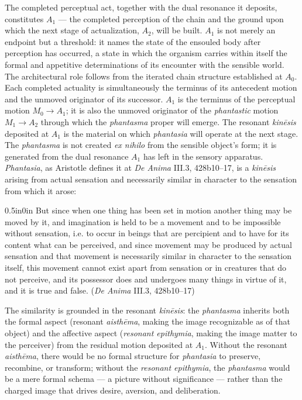 \documentclass{article}
\begin{document}
The completed perceptual act, together with the dual resonance it deposits, constitutes $A_1$ --- the completed perception of the chain and the ground upon which the next stage of actualization, $A_2$, will be built. $A_1$ is not merely an endpoint but a threshold: it names the state of the ensouled body after perception has occurred, a state in which the organism carries within itself the formal and appetitive determinations of its encounter with the sensible world. The architectural role follows from the iterated chain structure established at $A_0$. Each completed actuality is simultaneously the terminus of its antecedent motion and the unmoved originator of its successor. $A_1$ is the terminus of the perceptual motion $M_0 \rightarrow A_1$; it is also the unmoved originator of the \textit{phantastic} motion $M_1 \rightarrow A_2$ through which the \textit{phantasma} proper will emerge. The resonant \textit{kinēsis} deposited at $A_1$ is the material on which \textit{phantasia} will operate at the next stage. The \textit{phantasma} is not created \textit{ex nihilo} from the sensible object's form; it is generated from the dual resonance $A_1$ has left in the sensory apparatus. \textit{Phantasia}, as Aristotle defines it at \textit{De Anima} III.3, 428b10--17, is a \textit{kinēsis} arising from actual sensation and necessarily similar in character to the sensation from which it arose:
\begin{adjustwidth}{0.5in}{0in}
But since when one thing has been set in motion another thing may be moved by it, and imagination is held to be a movement and to be impossible without sensation, i.e. to occur in beings that are percipient and to have for its content what can be perceived, and since movement may be produced by actual sensation and that movement is necessarily similar in character to the sensation itself, this movement cannot exist apart from sensation or in creatures that do not perceive, and its possessor does and undergoes many things in virtue of it, and it is true and false. (\textit{De Anima} III.3, 428b10--17)
\end{adjustwidth}
The similarity is grounded in the resonant \textit{kinēsis}: the \textit{phantasma} inherits both the formal aspect (resonant \textit{aisthēma}, making the image recognizable as of that object) and the affective aspect (\textit{resonant epithymia}, making the image matter to the perceiver) from the residual motion deposited at $A_1$. Without the resonant \textit{aisthēma}, there would be no formal structure for \textit{phantasia} to preserve, recombine, or transform; without the \textit{resonant epithymia}, the \textit{phantasma} would be a mere formal schema --- a picture without significance --- rather than the charged image that drives desire, aversion, and deliberation.
\end{document}
